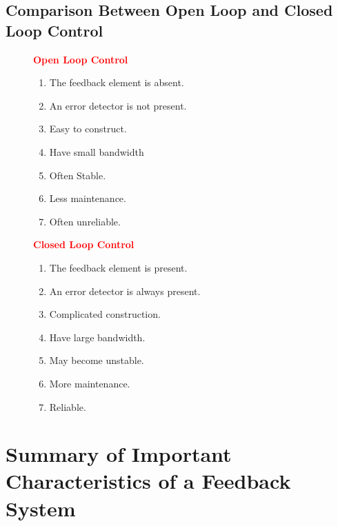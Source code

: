 \documentclass[
  14pt,
  a4paper,
  oneside,
  open=any,
  a4paper,
  14pt]{report}
\providecommand{\tightlist}{%
  \setlength{\itemsep}{0pt}\setlength{\parskip}{0pt}}\usepackage{longtable,booktabs,array}
\begin{document}
\subsection{Comparison Between Open Loop and Closed Loop
Control}\label{comparison-between-open-loop-and-closed-loop-control}

\begin{figure}[H]

\begin{minipage}{0.50\linewidth}
\textcolor{red}{\textbf{Open Loop Control}}

\begin{enumerate}
\def\labelenumi{\arabic{enumi}.}
\tightlist
\item
  The feedback element is absent.
\item
  An error detector is not present.
\item
  Easy to construct.
\item
  Have small bandwidth
\item
  Often Stable.
\item
  Less maintenance.
\item
  Often unreliable.
\end{enumerate}

\end{minipage}%
%
\begin{minipage}{0.50\linewidth}
\textcolor{red}{\textbf{Closed Loop Control}}

\begin{enumerate}
\def\labelenumi{\arabic{enumi}.}
\tightlist
\item
  The feedback element is present.
\item
  An error detector is always present.
\item
  Complicated construction.
\item
  Have large bandwidth.
\item
  May become unstable.
\item
  More maintenance.
\item
  Reliable.
\end{enumerate}

\end{minipage}%

\end{figure}%

\section{Summary of Important Characteristics of a Feedback
System}\label{summary-of-important-characteristics-of-a-feedback-system}
\end{document}
